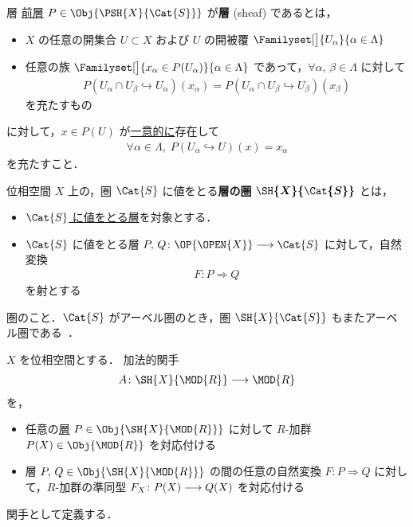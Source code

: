 \documentclass[TQFT_main]{subfiles}
\begin{document}

\begin{mydef}[label=def:sheaf]{層}
    \hyperref[def:presheaf]{前層} $P \in \Obj{\PSH{X}{\Cat{S}}}$ が\textbf{層} (sheaf) であるとは，
    \begin{itemize}
        \item $X$ の任意の開集合 $U \subset X$ および $U$ の開被覆 $\Familyset[\big]{U_\alpha}{\alpha\in \Lambda}$ 
        \item 任意の族 $\Familyset[\big]{x_\alpha \in P(U_\alpha)}{\alpha \in \Lambda}$ であって，$\forall \alpha,\, \beta \in \Lambda$ に対して
        \begin{align}
            P(U_\alpha \cap U_\beta \hookrightarrow U_\alpha)(x_\alpha) = P(U_\alpha \cap U_\beta \hookrightarrow U_\beta)(x_\beta)
        \end{align}
        を充たすもの
    \end{itemize}
    に対して，$x \in P(U)$ が\underline{一意的に}存在して
    \begin{align}
        \forall \alpha \in \Lambda,\; P(U_\alpha \hookrightarrow U)(x) = x_\alpha
    \end{align}
    を充たすこと．
\end{mydef}

位相空間 $X$ 上の，圏 $\Cat{S}$ に値をとる\textbf{層の圏} $\bm{\SH{X}{\Cat{S}}}$ とは，
\begin{itemize}
    \item \hyperref[def:sheaf]{$\Cat{S}$ に値をとる層}を対象とする．
    \item $\Cat{S}$ に値をとる層 $P,\, Q \colon \OP{\OPEN{X}} \lto \Cat{S}$ に対して，自然変換
    \begin{align}
        F \colon P \Longrightarrow Q
    \end{align}
    を射とする
\end{itemize}
圏のこと．$\Cat{S}$ がアーベル圏のとき，圏 $\SH{X}{\Cat{S}}$ もまたアーベル圏である~\cite[p.298, 命題4.30]{Shiho2016}．

$X$ を位相空間とする．
加法的関手
\begin{align}
    \label{eq:additive-sheaf}
    A \colon \SH{X}{\MOD{R}} \lto \MOD{R}
\end{align}
を，
\begin{itemize}
    \item 任意の\hyperref[def:sheaf]{層} $P \in \Obj{\SH{X}{\MOD{R}}}$ に対して $R$-加群 $P(X) \in \Obj{\MOD{R}}$ を対応付ける
    \item 層 $P,\, Q \in \Obj{\SH{X}{\MOD{R}}}$ の間の任意の自然変換 $F \colon P \Longrightarrow Q$ に対して，$R$-加群の準同型 $F_X \colon P(X) \longrightarrow Q(X)$ を対応付ける
\end{itemize}
関手として定義する．
\end{document}
